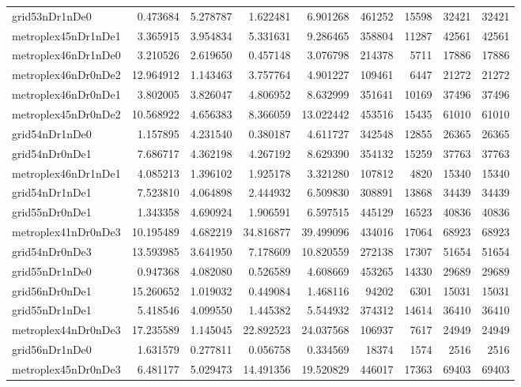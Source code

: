 \begin{longtable}{|l|r|r|r|r|r|r|r|r|}
grid53nDr1nDe0 & 0.473684 & 5.278787 & 1.622481 & 6.901268 & 461252 & 15598 & 32421 & 32421 \\
metroplex45nDr1nDe1 & 3.365915 & 3.954834 & 5.331631 & 9.286465 & 358804 & 11287 & 42561 & 42561 \\
metroplex46nDr1nDe0 & 3.210526 & 2.619650 & 0.457148 & 3.076798 & 214378 & 5711 & 17886 & 17886 \\
metroplex46nDr0nDe2 & 12.964912 & 1.143463 & 3.757764 & 4.901227 & 109461 & 6447 & 21272 & 21272 \\
metroplex46nDr0nDe1 & 3.802005 & 3.826047 & 4.806952 & 8.632999 & 351641 & 10169 & 37496 & 37496 \\
metroplex45nDr0nDe2 & 10.568922 & 4.656383 & 8.366059 & 13.022442 & 453516 & 15435 & 61010 & 61010 \\
grid54nDr1nDe0 & 1.157895 & 4.231540 & 0.380187 & 4.611727 & 342548 & 12855 & 26365 & 26365 \\
grid54nDr0nDe1 & 7.686717 & 4.362198 & 4.267192 & 8.629390 & 354132 & 15259 & 37763 & 37763 \\
metroplex46nDr1nDe1 & 4.085213 & 1.396102 & 1.925178 & 3.321280 & 107812 & 4820 & 15340 & 15340 \\
grid54nDr1nDe1 & 7.523810 & 4.064898 & 2.444932 & 6.509830 & 308891 & 13868 & 34439 & 34439 \\
grid55nDr0nDe1 & 1.343358 & 4.690924 & 1.906591 & 6.597515 & 445129 & 16523 & 40836 & 40836 \\
metroplex41nDr0nDe3 & 10.195489 & 4.682219 & 34.816877 & 39.499096 & 434016 & 17064 & 68923 & 68923 \\
grid54nDr0nDe3 & 13.593985 & 3.641950 & 7.178609 & 10.820559 & 272138 & 17307 & 51654 & 51654 \\
grid55nDr1nDe0 & 0.947368 & 4.082080 & 0.526589 & 4.608669 & 453265 & 14330 & 29689 & 29689 \\
grid56nDr0nDe1 & 15.260652 & 1.019032 & 0.449084 & 1.468116 & 94202 & 6301 & 15031 & 15031 \\
grid55nDr1nDe1 & 5.418546 & 4.099550 & 1.445382 & 5.544932 & 374312 & 14614 & 36410 & 36410 \\
metroplex44nDr0nDe3 & 17.235589 & 1.145045 & 22.892523 & 24.037568 & 106937 & 7617 & 24949 & 24949 \\
grid56nDr1nDe0 & 1.631579 & 0.277811 & 0.056758 & 0.334569 & 18374 & 1574 & 2516 & 2516 \\
metroplex45nDr0nDe3 & 6.481177 & 5.029473 & 14.491356 & 19.520829 & 446017 & 17363 & 69403 & 69403 \\

\end{longtable}
